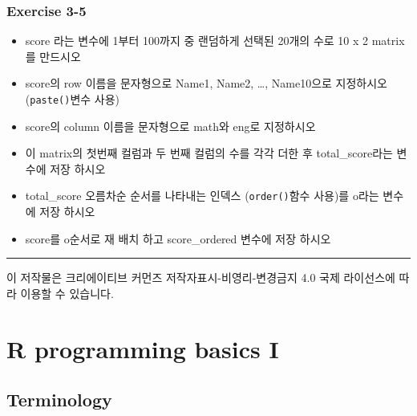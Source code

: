 \documentclass[
]{book}
\providecommand{\tightlist}{%
  \setlength{\itemsep}{0pt}\setlength{\parskip}{0pt}}
\begin{document}
\hypertarget{exercise-3-5}{%
\subsection{Exercise 3-5}\label{exercise-3-5}}

\begin{itemize}
\tightlist
\item
  score 라는 변수에 1부터 100까지 중 랜덤하게 선택된 20개의 수로 10 x 2 matrix를 만드시오
\item
  score의 row 이름을 문자형으로 Name1, Name2, \ldots, Name10으로 지정하시오 (\texttt{paste()}변수 사용)
\item
  score의 column 이름을 문자형으로 math와 eng로 지정하시오
\item
  이 matrix의 첫번째 컬럼과 두 번째 컬럼의 수를 각각 더한 후 total\_score라는 변수에 저장 하시오
\item
  total\_score 오름차순 순서를 나타내는 인덱스 (\texttt{order()}함수 사용)를 o라는 변수에 저장 하시오
\item
  score를 o순서로 재 배치 하고 score\_ordered 변수에 저장 하시오
\end{itemize}

\begin{center}\rule{0.5\linewidth}{0.5pt}\end{center}

이 저작물은 크리에이티브 커먼즈 저작자표시-비영리-변경금지 4.0 국제 라이선스에 따라 이용할 수 있습니다.

\hypertarget{r-programming-basics-i}{%
\chapter{R programming basics I}\label{r-programming-basics-i}}

\hypertarget{terminology}{%
\section{Terminology}\label{terminology}}
\end{document}
